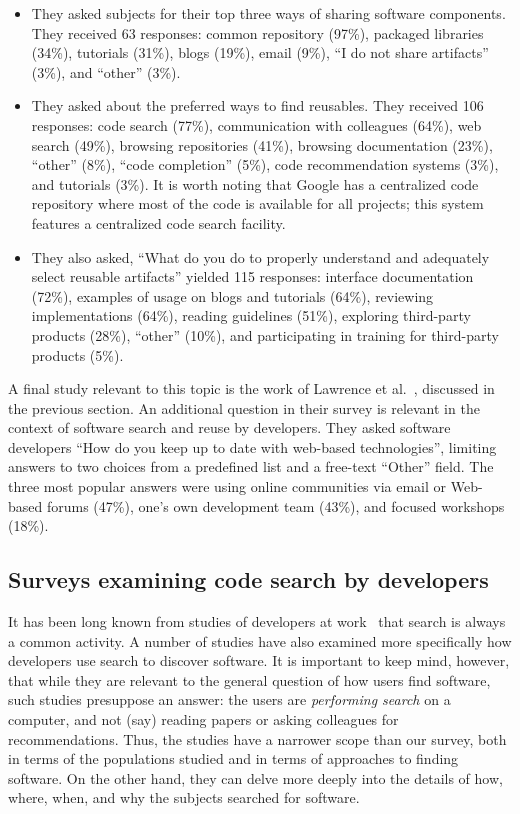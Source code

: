 \documentclass{casicswhitepaper}
\begin{document}
\begin{itemize}

\item They asked subjects for their top three ways of sharing software components.  They received 63 responses: common repository (97\%), packaged libraries (34\%), tutorials (31\%), blogs (19\%), email (9\%), ``I do not share artifacts'' (3\%), and ``other'' (3\%).

\item They asked about the preferred ways to find reusables.  They received 106 responses: code search (77\%), communication with colleagues (64\%), web search (49\%), browsing repositories (41\%), browsing documentation (23\%), ``other'' (8\%), ``code completion'' (5\%), code recommendation systems (3\%), and tutorials (3\%).  It is worth noting that Google has a centralized code repository where most of the code is available for all projects; this system features a centralized code search facility.

\item They also asked, ``What do you do to properly understand and adequately select reusable artifacts'' yielded 115 responses: interface documentation (72\%), examples of usage on blogs and tutorials (64\%), reviewing implementations (64\%), reading guidelines (51\%), exploring third-party products (28\%), ``other'' (10\%), and participating in training for third-party products (5\%).

\end{itemize}

A final study relevant to this topic is the work of Lawrence et al.~\cite{lawrence2015science, lawrence2014who}, discussed in the previous section.  An additional question in their survey is relevant in the context of software search and reuse by developers.  They asked software developers ``How do you keep up to date with web-based technologies'', limiting answers to two choices from a predefined list and a free-text ``Other'' field.  The three most popular answers were using online communities via email or Web-based forums (47\%), one's own development team (43\%), and focused workshops (18\%).


\subsection{Surveys examining code search by developers}

It has been long known from studies of developers at work~\cite[e.g.,][]{singer1997examination} that search is always a common activity.  A number of studies have also examined more specifically how developers use search to discover software.  It is important to keep mind, however, that while they are relevant to the general question of how users find software, such studies presuppose an answer: the users are \emph{performing search} on a computer, and not (say) reading papers or asking colleagues for recommendations.  Thus, the studies have a narrower scope than our survey, both in terms of the populations studied and in terms of approaches to finding software.  On the other hand, they can delve more deeply into the details of how, where, when, and why the subjects searched for software.
\end{document}
